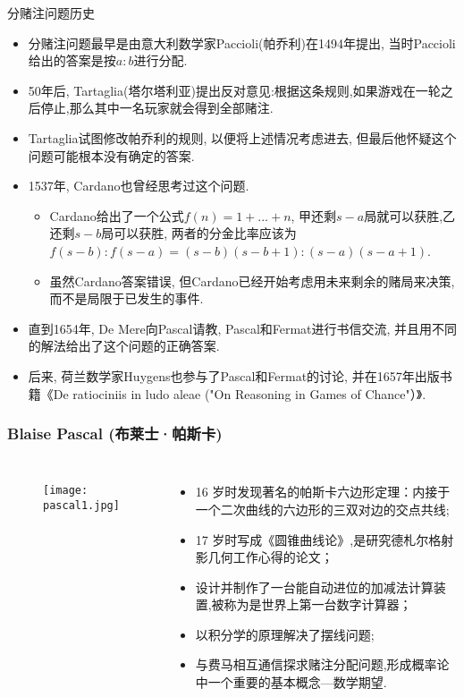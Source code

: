 \begin{frame}{分赌注问题历史}
	\vspace{-0.15cm}
\begin{itemize}[<+-|alert@+>]
	\item 分赌注问题最早是由意大利数学家Paccioli(帕乔利)在1494年提出, 当时Paccioli给出的答案是按$a:b$进行分配.
	\item 50年后, Tartaglia(塔尔塔利亚)提出反对意见:根据这条规则,如果游戏在一轮之后停止,那么其中一名玩家就会得到全部赌注.
	\item Tartaglia试图修改帕乔利的规则, 以便将上述情况考虑进去, 但最后他怀疑这个问题可能根本没有确定的答案.
	\item 1537年, Cardano也曾经思考过这个问题.
	\begin{itemize}[<+-|alert@+>]
		\item Cardano给出了一个公式$f(n)=1+...+n$, 甲还剩$s-a$局就可以获胜,乙还剩$s-b$局可以获胜, 两者的分金比率应该为$f(s-b):f(s-a)=(s-b)(s-b+1):(s-a)(s-a+1)$.
		\item 虽然Cardano答案错误, 但Cardano已经开始考虑用未来剩余的赌局来决策,而不是局限于已发生的事件.
	\end{itemize}
    \item 直到1654年, De Mere向Pascal请教, Pascal和Fermat进行书信交流, 并且用不同的解法给出了这个问题的正确答案.
    \item 后来, 荷兰数学家Huygens也参与了Pascal和Fermat的讨论, 并在1657年出版书籍《De ratiociniis in ludo aleae ("On Reasoning in Games of Chance"）》.

\end{itemize}


\end{frame}


\begin{frame}
  \frametitle{{\rm Blaise Pascal} (布莱士·帕斯卡)}
  \begin{columns}
    \column{4cm}
    \begin{figure}[htbp]\nonumber

      \centering
      \texttt{[image: pascal1.jpg]}

    \end{figure}
    \column{6.5cm}
    \begin{itemize}[<+-|alert@+>]
    \item 16 岁时发现著名的帕斯卡六边形定理：内接于一个二次曲线的六边形的三双对边的交点共线;
    \item 17 岁时写成《圆锥曲线论》,是研究德札尔格射影几何工作心得的论文；
    \item 设计并制作了一台能自动进位的加减法计算装置,被称为是世界上第一台数字计算器；
    \item 以积分学的原理解决了摆线问题;
    \item 与费马相互通信探求赌注分配问题,形成概率论中一个重要的基本概念—数学期望.
    \end{itemize}
  \end{columns}
\end{frame}



